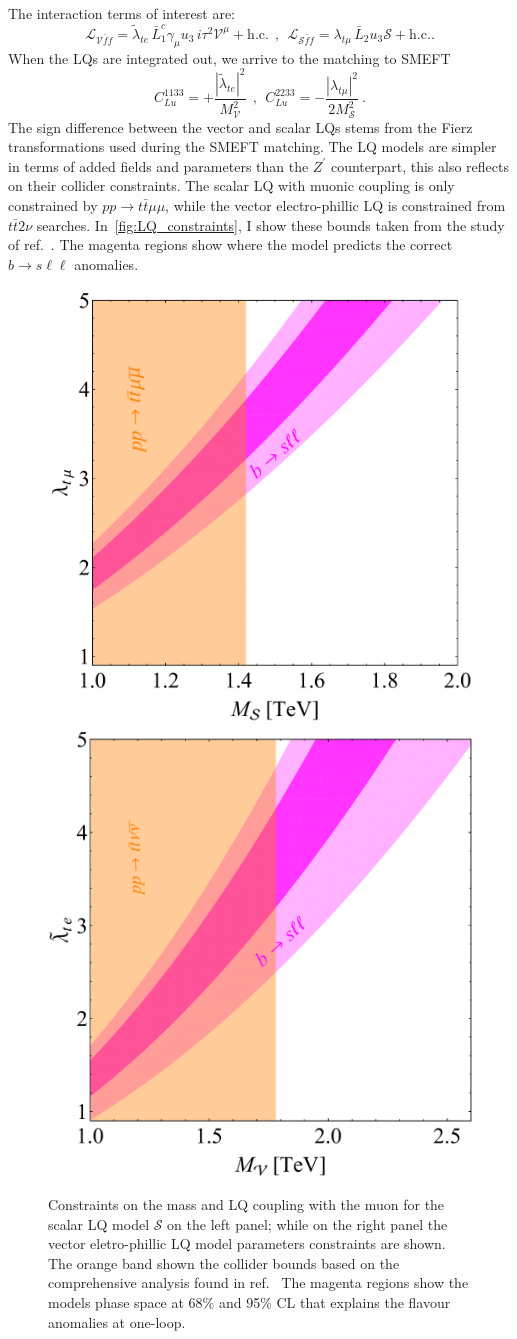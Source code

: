 The interaction terms of interest are:
\begin{equation}
	\mathcal{L}_{\mathcal V \bar f f} =  \tilde \lambda_{t e}  \, \bar L^c_1\gamma_\mu u_{3} \, i \tau^2 \mathcal V^\mu  + \mathrm{h.c.} 
	\ \ , \ \
	\mathcal{L}_{\mathcal S \bar f f} =  \lambda_{t \mu} \,  \bar L_2 u_{3} \mathcal{S}  + \mathrm{h.c.}.
\end{equation}
When the LQs are integrated out, we arrive to the matching to SMEFT
\begin{equation}
	C_{Lu}^{1133} = +\frac{| \tilde \lambda_{t e}|^2}{M_{\mathcal V} ^2 }  
	\ \ , \ \ C_{Lu}^{2233} = -\frac{|  \lambda_{t \mu}|^2}{2 M_{\mathcal S}^2 } \ .
\end{equation}
The sign difference between the vector and scalar LQs stems from the Fierz transformations used during the SMEFT matching.
The LQ models are simpler in terms of added fields and parameters than the $Z^\prime$ counterpart, this also reflects on their collider constraints. The scalar LQ with muonic coupling is only constrained by $pp \to t \bar t \mu \mu$, while the vector electro-phillic LQ is constrained from $t \bar t 2 \nu$ searches. 
In~\autoref{fig:LQ_constraints}, I show these bounds taken from the study of ref.~\cite{Angelescu:2018tyl}. The magenta regions show where the model predicts the correct $b \to s \ell \ell$ anomalies.
\begin{figure}[htpb!]
	\centering 
	\includegraphics[width=0.45\linewidth]{figures/Scalar_LQ.pdf}
	\includegraphics[width=0.435\linewidth]{figures/Vector_LQ.pdf}
	\caption{Constraints on the mass and LQ coupling with the muon for the scalar LQ model $\mathcal S$ on the left panel; while on the right panel the vector eletro-phillic LQ model parameters constraints are shown. The orange band shown the collider bounds based on the comprehensive analysis found in ref.~\cite{Angelescu:2018tyl} The magenta regions show the models phase space at 68\% and 95\% CL that explains the flavour anomalies at one-loop.}    
	\label{fig:LQ_constraints}
\end{figure}
